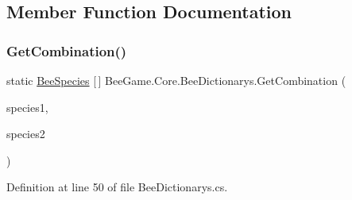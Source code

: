 \subsection{Member Function Documentation}
\mbox{\label{class_bee_game_1_1_core_1_1_bee_dictionarys_ac2d555d589392daf8d2919b6bf1fbad1}} 
\subsubsection{\texorpdfstring{Get\+Combination()}{GetCombination()}}
{\footnotesize\ttfamily static \hyperlink{namespace_bee_game_1_1_enums_aa2ead984825678d83c42d48f6382619c}{Bee\+Species} \mbox{[}$\,$\mbox{]} Bee\+Game.\+Core.\+Bee\+Dictionarys.\+Get\+Combination (\begin{DoxyParamCaption}\item[{\hyperlink{namespace_bee_game_1_1_enums_aa2ead984825678d83c42d48f6382619c}{Bee\+Species}}]{species1,  }\item[{\hyperlink{namespace_bee_game_1_1_enums_aa2ead984825678d83c42d48f6382619c}{Bee\+Species}}]{species2 }\end{DoxyParamCaption})\hspace{0.3cm}{\ttfamily [static]}}



Definition at line 50 of file Bee\+Dictionarys.\+cs.


